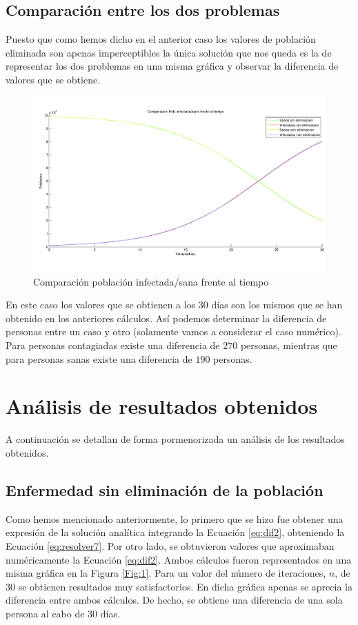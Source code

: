 \documentclass[a4paper,11pt]{article}
\numberwithin{equation}{section}
\begin{document}
\subsection{Comparación entre los dos problemas}
\indent Puesto que como hemos dicho en el anterior caso los valores de población eliminada son apenas imperceptibles la única solución que nos queda es la de representar los dos problemas en una misma gráfica y observar la diferencia de valores que se obtiene. \\
\begin{figure}[h!]
	\centering 		
	\includegraphics[width=1\textwidth]{grafica6.pdf}
	\caption{Comparación población infectada/sana frente al tiempo}
	\label{Fig:6}
\end{figure}

\newpage
\indent En este caso los valores que se obtienen a los 30 días son los mismos que se han obtenido en los anteriores cálculos. Así podemos determinar la diferencia de personas entre un caso y otro (solamente vamos a considerar el caso numérico). Para personas contagiadas existe una diferencia de $ 270 $ personas, mientras que para personas sanas existe una diferencia de $ 190 $ personas. 

\section{Análisis de resultados obtenidos}
\indent A continuación se detallan de forma pormenorizada un análisis de los resultados obtenidos.
\subsection{Enfermedad sin eliminación de la población}
\indent Como hemos mencionado anteriormente, lo primero que se hizo fue obtener una expresión de la solución analítica integrando la Ecuación \ref{eq:dif2}, obteniendo la Ecuación \ref{eq:resolver7}. Por otro lado, se obtuvieron valores que aproximaban numéricamente la Ecuación \ref{eq:dif2}. Ambos cálculos fueron representados en una misma gráfica en la Figura \ref{Fig:1}. Para un valor del número de iteraciones, $ n $, de 30 se obtienen resultados muy satisfactorios. En dicha gráfica apenas se aprecia la diferencia entre ambos cálculos. De hecho, se obtiene una diferencia de una sola persona al cabo de 30 días.\\
\end{document}
